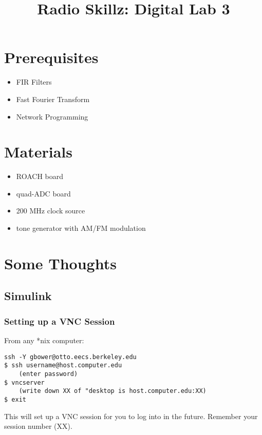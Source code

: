\documentclass[11pt]{article}
\begin{document}
\title{Radio Skillz: Digital Lab 3}

\maketitle

\section*{Prerequisites}

\begin{itemize}
\item FIR Filters
\item Fast Fourier Transform
\item Network Programming
\end{itemize}

\section*{Materials}

\begin{itemize}
\item ROACH board
\item quad-ADC board
\item 200 MHz clock source
\item tone generator with AM/FM modulation
\end{itemize}

\section*{Some Thoughts}

\subsection*{Simulink}

\subsubsection*{Setting up a VNC Session}

From any *nix computer:
\begin{verbatim}
ssh -Y gbower@otto.eecs.berkeley.edu
$ ssh username@host.computer.edu
    (enter password)
$ vncserver
    (write down XX of "desktop is host.computer.edu:XX)
$ exit
\end{verbatim}
This will set up a VNC session for you to log into in the future.  Remember
your session number (XX).
\end{document}
